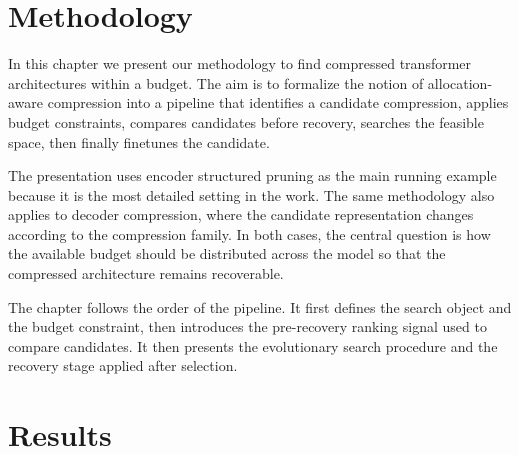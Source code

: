\chapter{Methodology}

In this chapter we present our methodology to find compressed transformer architectures within a budget. The aim is to formalize the notion of allocation-aware compression into a pipeline that identifies a candidate compression, applies budget constraints, compares candidates before recovery, searches the feasible space, then finally finetunes the candidate.

The presentation uses encoder structured pruning as the main running example because it is the most detailed setting in the work. The same methodology also applies to decoder compression, where the candidate representation changes according to the compression family. In both cases, the central question is how the available budget should be distributed across the model so that the compressed architecture remains recoverable.

The chapter follows the order of the pipeline. It first defines the search object and the budget constraint, then introduces the pre-recovery ranking signal used to compare candidates. It then presents the evolutionary search procedure and the recovery stage applied after selection.

\clearpage











\chapter{Results}



